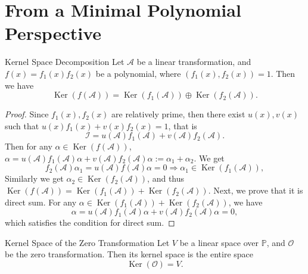 \section{From a Minimal Polynomial Perspective}


\begin{theorem}{Kernel Space Decomposition}{}
  Let $\mathcal{A}$ be a linear transformation,
  and $f(x) = f_1(x) f_2(x)$ be a polynomial,
  where $(f_1(x), f_2(x)) = 1$.
  Then we have
  \begin{equation}
    \operatorname{Ker}(f(\mathcal{A}))
    = \operatorname{Ker}(f_1(\mathcal{A})) \oplus \operatorname{Ker}(f_2(\mathcal{A})).
  \end{equation}
\end{theorem}

\begin{proof}
  Since $f_1(x), f_2(x)$ are relatively prime, then there exist $u(x), v(x)$
  such that $u(x)f_1(x) + v(x)f_2(x) = 1$, that is
  \begin{equation}
    \mathcal{I} = u(\mathcal{A}) f_1(\mathcal{A}) + v(\mathcal{A}) f_2(\mathcal{A}).
  \end{equation}
  Then for any $\alpha \in \operatorname{Ker}(f(\mathcal{A}))$,
  $\alpha = u(\mathcal{A})f_1(\mathcal{A})\alpha +
  v(\mathcal{A})f_2(\mathcal{A})\alpha := \alpha_1 + \alpha_2$.
  We get
  \begin{equation}
    f_2(\mathcal{A}) \alpha_1 = u(\mathcal{A})f(\mathcal{A})\alpha = 0 \Rightarrow
    \alpha_1 \in \operatorname{Ker}(f_1(\mathcal{A})),
  \end{equation}
  Similarly we get $\alpha_2 \in \operatorname{Ker}(f_2(\mathcal{A}))$, and thus
  $\operatorname{Ker}(f(\mathcal{A})) = \operatorname{Ker}(f_1(\mathcal{A}))
  + \operatorname{Ker}(f_2(\mathcal{A}))$.
  Next, we prove that it is direct sum. For any $\alpha \in
  \operatorname{Ker}(f_1(\mathcal{A})) + \operatorname{Ker}(f_2(\mathcal{A}))$,
  we have
  \begin{equation}
    \alpha = u(\mathcal{A})f_1(\mathcal{A})\alpha + v(\mathcal{A}) f_2(\mathcal{A})\alpha = 0,
  \end{equation}
  which satisfies the condition for direct sum.
\end{proof}

\begin{lemma}{Kernel Space of the Zero Transformation}{}
  Let $V$ be a linear space over $\mathbb{P}$,
  and $\mathcal{O}$ be the zero transformation.
  Then its kernel space is the entire space
  \begin{equation}
    \operatorname{Ker}(\mathcal{O}) = V.
  \end{equation}
\end{lemma}

